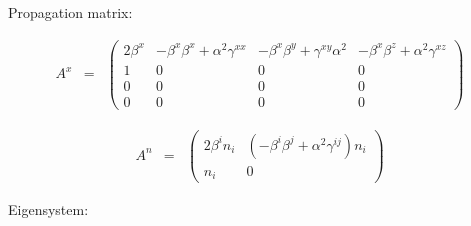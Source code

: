 \documentclass{article}
\begin{document}
   Propagation matrix:

\begin{eqnarray}
   A^x & = & \left( \begin{array}{cccc}
%
   2 \beta^x & - \beta^x \beta^x + \alpha^2 \gamma^{xx} & - \beta^x
   \beta^y + \gamma^{xy} \alpha^2 & -\beta^x \beta^z + \alpha^2
   \gamma^{xz}
\\
   1 & 0 & 0 & 0
\\
   0 & 0 & 0 & 0
\\
   0 & 0 & 0 & 0
%
   \end{array} \right)
\end{eqnarray}

\begin{eqnarray}
   A^n & = & \left( \begin{array}{cc}
%
   2 \beta^i n_i & \left( - \beta^i \beta^j + \alpha^2 \gamma^{ij}
   \right) n_i
\\
   n_i & 0
%
   \end{array} \right)
\end{eqnarray}

   Eigensystem:

\end{document}
